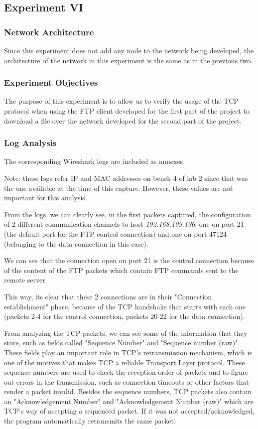 \documentclass[11pt,a4paper,twocolumn]{article}
\begin{document}
\subsection{Experiment VI}

\subsubsection{Network Architecture}

Since this experiment does not add any node to the network being developed, the architecture of the network in this experiment is the same as in the previous two.

\subsubsection{Experiment Objectives}

The purpose of this experiment is to allow us to verify the usage of the TCP protocol when using the FTP client developed for the first part of the project to download a file over the network developed for the second part of the project.

\subsubsection{Log Analysis}

The corresponding Wireshark logs are included as annexes.

Note: these logs refer IP and MAC addresses on bench 4 of lab 2 since that was the one available at the time of this capture. However, these values are not important for this analysis.

From the logs, we can clearly see, in the first packets captured, the configuration of 2 different communication channels to host \textit{192.168.109.136}, one on port 21 (the default port for the FTP control connection) and one on port 47124 (belonging to the data connection in this case).

We can see that the connection open on port 21 is the control connection because of the content of the FTP packets which contain FTP commands sent to the remote server.

This way, its clear that these 2 connections are in their "Connection establishment" phase, because of the TCP handshake that starts with each one (packets 2-4 for the control connection, packets 20-22 for the data connection).

From analyzing the TCP packets, we can see some of the information that they store, such as fields called "Sequence Number" and "Sequence number (raw)". These fields play an important role in TCP's retransmission mechanism, which is one of the motives that makes TCP a reliable Transport Layer protocol. These sequence numbers are used to check the reception order of packets and to figure out errors in the transmission, such as connection timeouts or other factors that render a packet invalid. Besides the sequence numbers, TCP packets also contain an "Acknowledgement Number" and "Acknowledgement Number (raw)" which are TCP's way of accepting a sequenced packet. If it was not accepted/acknowledged, the program automatically retransmits the same packet.
\end{document}
